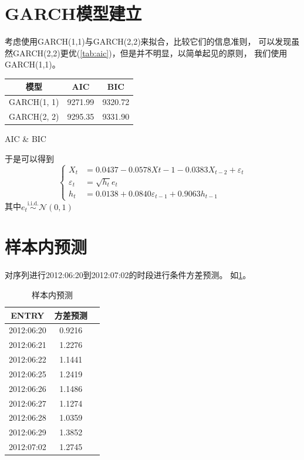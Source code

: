 \documentclass[cn]{homework}
\begin{document}
    \section{GARCH模型建立}
    考虑使用GARCH(1,1)与GARCH(2,2)来拟合，比较它们的信息准则，
    可以发现虽然GARCH(2,2)更优(\cref{tab:aic})，但是并不明显，以简单起见的原则，
    我们使用GARCH(1,1)。

    \begin{margintable}
        \centering
        \begin{tabular}{ccc}
            \toprule
            模型 & AIC & BIC \\
            \midrule
            GARCH(1, 1) & 9271.99 & 9320.72 \\
            GARCH(2, 2) & 9295.35 & 9331.90 \\
            \bottomrule
        \end{tabular}
        \caption{AIC \& BIC}
        \label{tab:aic}
    \end{margintable}

    于是可以得到
    \[\left\{\begin{aligned}
        X_t&=0.0437-0.0578X{t-1}-0.0383X_{t-2}+\varepsilon_t\\
        \varepsilon_t&=\sqrt{h_t}e_t\\
        h_t&=0.0138+0.0840\varepsilon_{t-1}+0.9063h_{t-1}
    \end{aligned}\right.\]
    其中$e_t\stackrel{\text{i.i.d.}}{\sim}\mathcal N(0,1)$

    \section{样本内预测}
    对序列进行2012:06:20到2012:07:02的时段进行条件方差预测。
    如\cref{tab:forecast}。
    \begin{table}
        \centering
        \begin{tabular}{ccc}
            \toprule
            ENTRY & 方差预测 \\
            \midrule
            2012:06:20 & 0.9216 \\
            2012:06:21 & 1.2276 \\
            2012:06:22 & 1.1441 \\
            2012:06:25 & 1.2419 \\
            2012:06:26 & 1.1486 \\
            2012:06:27 & 1.1274 \\
            2012:06:28 & 1.0359 \\
            2012:06:29 & 1.3852 \\
            2012:07:02 & 1.2745 \\
            \bottomrule
        \end{tabular}
        \caption{样本内预测}
        \label{tab:forecast}
    \end{table}
\end{document}
